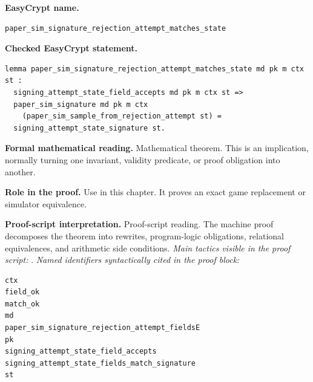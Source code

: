 \begin{formaltheorem}
\noindent\textbf{EasyCrypt name.}
\begin{lstlisting}[language=EasyCrypt,basicstyle=\ttfamily\scriptsize]
paper_sim_signature_rejection_attempt_matches_state
\end{lstlisting}
\noindent\textbf{Checked EasyCrypt statement.}
\begin{lstlisting}[language=EasyCrypt,basicstyle=\ttfamily\scriptsize]
lemma paper_sim_signature_rejection_attempt_matches_state md pk m ctx st :
  signing_attempt_state_field_accepts md pk m ctx st =>
  paper_sim_signature md pk m ctx
    (paper_sim_sample_from_rejection_attempt st) =
  signing_attempt_state_signature st.
\end{lstlisting}
\noindent\textbf{Formal mathematical reading.}
Mathematical theorem. This is an implication, normally turning one invariant, validity predicate, or proof obligation into another.

\noindent\textbf{Role in the proof.}
Use in this chapter. It proves an exact game replacement or simulator equivalence.

\noindent\textbf{Proof-script interpretation.}
Proof-script reading. The machine proof decomposes the theorem into rewrites, program-logic obligations, relational equivalences, and arithmetic side conditions.
\emph{Main tactics visible in the proof script:} .
\emph{Named identifiers syntactically cited in the proof block:}
\begin{lstlisting}[language=EasyCrypt,basicstyle=\ttfamily\scriptsize]
ctx
field_ok
match_ok
md
paper_sim_signature_rejection_attempt_fieldsE
pk
signing_attempt_state_field_accepts
signing_attempt_state_fields_match_signature
st
\end{lstlisting}

\end{formaltheorem}

